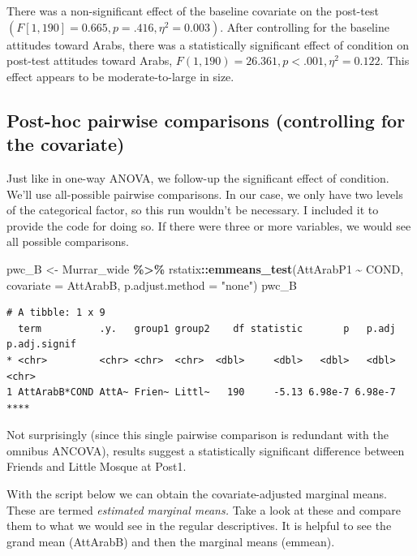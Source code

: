 \documentclass[
  11pt,
]{book}
\newenvironment{Shaded}{\begin{snugshade}}{\end{snugshade}}
\newcommand{\AttributeTok}[1]{\textcolor[rgb]{0.27,0.27,0.27}{#1}}
\newcommand{\FunctionTok}[1]{\textcolor[rgb]{0.27,0.27,0.27}{\textbf{#1}}}
\newcommand{\NormalTok}[1]{#1}
\newcommand{\OtherTok}[1]{\textcolor[rgb]{0.37,0.37,0.37}{#1}}
\newcommand{\SpecialCharTok}[1]{\textcolor[rgb]{0.43,0.43,0.43}{\textbf{#1}}}
\newcommand{\StringTok}[1]{\textcolor[rgb]{0.5,0.5,0.5}{#1}}
\begin{document}
There was a non-significant effect of the baseline covariate on the post-test \((F[1, 190] = 0.665, p = .416, \eta^2 = 0.003)\). After controlling for the baseline attitudes toward Arabs, there was a statistically significant effect of condition on post-test attitudes toward Arabs, \(F(1,190) = 26.361, p < .001, \eta^2 = 0.122\). This effect appears to be moderate-to-large in size.

\hypertarget{post-hoc-pairwise-comparisons-controlling-for-the-covariate}{%
\subsection{Post-hoc pairwise comparisons (controlling for the covariate)}\label{post-hoc-pairwise-comparisons-controlling-for-the-covariate}}

Just like in one-way ANOVA, we follow-up the significant effect of condition. We'll use all-possible pairwise comparisons. In our case, we only have two levels of the categorical factor, so this run wouldn't be necessary. I included it to provide the code for doing so. If there were three or more variables, we would see all possible comparisons.

\begin{Shaded}
\begin{Highlighting}[]
\NormalTok{pwc\_B }\OtherTok{\textless{}{-}}\NormalTok{ Murrar\_wide }\SpecialCharTok{\%\textgreater{}\%}
\NormalTok{    rstatix}\SpecialCharTok{::}\FunctionTok{emmeans\_test}\NormalTok{(AttArabP1 }\SpecialCharTok{\textasciitilde{}}\NormalTok{ COND, }\AttributeTok{covariate =}\NormalTok{ AttArabB, }\AttributeTok{p.adjust.method =} \StringTok{"none"}\NormalTok{)}
\NormalTok{pwc\_B}
\end{Highlighting}
\end{Shaded}

\begin{verbatim}
# A tibble: 1 x 9
  term          .y.   group1 group2    df statistic       p   p.adj p.adj.signif
* <chr>         <chr> <chr>  <chr>  <dbl>     <dbl>   <dbl>   <dbl> <chr>       
1 AttArabB*COND AttA~ Frien~ Littl~   190     -5.13 6.98e-7 6.98e-7 ****        
\end{verbatim}

Not surprisingly (since this single pairwise comparison is redundant with the omnibus ANCOVA), results suggest a statistically significant difference between Friends and Little Mosque at Post1.

With the script below we can obtain the covariate-adjusted marginal means. These are termed \emph{estimated marginal means.} Take a look at these and compare them to what we would see in the regular descriptives. It is helpful to see the grand mean (AttArabB) and then the marginal means (emmean).
\end{document}
